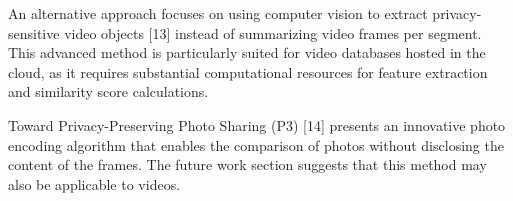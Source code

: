 An alternative approach focuses on using computer vision to extract privacy-sensitive video objects [13] instead of summarizing video frames per segment. This advanced method is particularly suited for video databases hosted in the cloud, as it requires substantial computational resources for feature extraction and similarity score calculations.

Toward Privacy-Preserving Photo Sharing (P3) [14] presents an innovative photo encoding algorithm that enables the comparison of photos without disclosing the content of the frames. The future work section suggests that this method may also be applicable to videos.